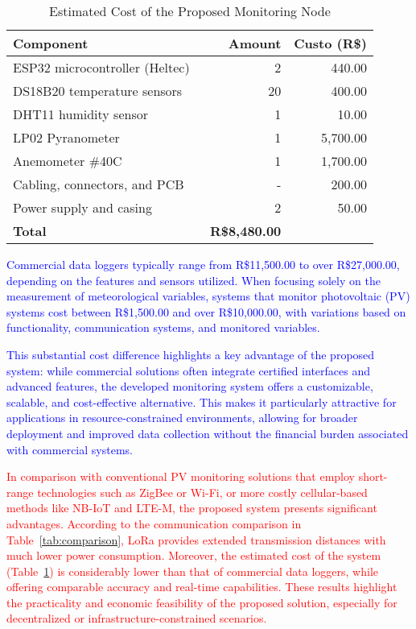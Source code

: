 \begin{table}[htbp]
\caption{Estimated Cost of the Proposed Monitoring Node}
\label{tab:cost_analysis}
\centering
\begin{tabular}{l r r}
\toprule
\textbf{Component} & \textbf{Amount} & \textbf{Custo (R\$)}\\
\midrule
ESP32 microcontroller (Heltec) & 2 & 440.00 \\
DS18B20 temperature sensors & 20 & 400.00 \\
DHT11 humidity sensor & 1 & 10.00 \\
LP02 Pyranometer & 1 & 5,700.00 \\
Anemometer \#40C & 1 & 1,700.00 \\
Cabling, connectors, and PCB &  - & 200.00 \\
Power supply and casing & 2 & 50.00 \\
\midrule
\textbf{Total} & \textbf{~R\$8,480.00} \\
\bottomrule
\end{tabular}
\end{table}


\textcolor{blue}{
Commercial data loggers typically range from R\$11,500.00 to over R\$27,000.00, depending on the features and sensors utilized. When focusing solely on the measurement of meteorological variables, systems that monitor photovoltaic (PV) systems cost between R\$1,500.00 and over R\$10,000.00, with variations based on functionality, communication systems, and monitored variables.
}

\textcolor{blue}{
This substantial cost difference highlights a key advantage of the proposed system: while commercial solutions often integrate certified interfaces and advanced features, the developed monitoring system offers a customizable, scalable, and cost-effective alternative. This makes it particularly attractive for applications in resource-constrained environments, allowing for broader deployment and improved data collection without the financial burden associated with commercial systems.
}

\textcolor{red}{
In comparison with conventional PV monitoring solutions that employ short-range technologies such as ZigBee or Wi-Fi, or more costly cellular-based methods like NB-IoT and LTE-M, the proposed system presents significant advantages. According to the communication comparison in Table~\ref{tab:comparison}, LoRa provides extended transmission distances with much lower power consumption. Moreover, the estimated cost of the system (Table~\ref{tab:cost_analysis}) is considerably lower than that of commercial data loggers, while offering comparable accuracy and real-time capabilities. These results highlight the practicality and economic feasibility of the proposed solution, especially for decentralized or infrastructure-constrained scenarios.
}

